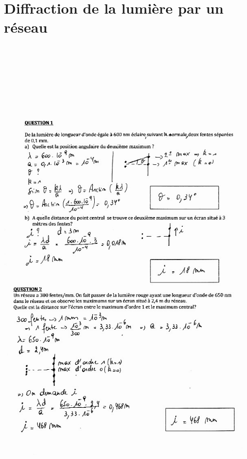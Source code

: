 \section{Diffraction de la lumière par un réseau}

\includegraphics[width=18.508cm,height=26.033cm]{Pictures/100000010000025F000003435F03932190A92825.png}

